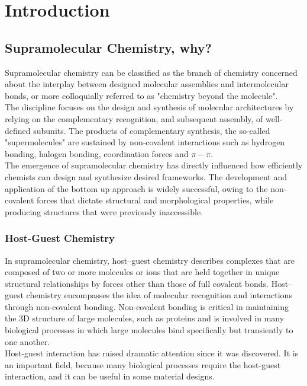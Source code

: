 \documentclass[../Master.tex]{subfiles}
\begin{document}
\chapter{Introduction}
\section{Supramolecular Chemistry, why?}\label{sec:supramolecular-chemistry}
Supramolecular chemistry can be classified as the branch of chemistry concerned about the interplay between designed molecular assemblies and intermolecular bonds, or more colloquially referred to as "chemistry beyond the molecule". \\
The discipline focuses on the design and synthesis of molecular architectures by relying on the complementary recognition, and subsequent assembly, of well-defined subunits. The products of complementary synthesis, the so-called "supermolecules" are sustained by non-covalent interactions such as hydrogen bonding, halogen bonding, coordination forces and \(\pi-\pi\). \\
The emergence of supramolecular chemistry has directly influenced how efficiently chemists can design and synthesize desired frameworks. The development and application of the bottom up approach is widely successful, owing to the non-covalent forces that dictate structural and morphological properties, while producing structures that were previously inaccessible.

\subsection{Host-Guest Chemistry}\label{subsec:host-guest-chemistry}

In supramolecular chemistry, host–guest chemistry describes complexes that are composed of two or more molecules or ions that are held together in unique structural relationships by forces other than those of full covalent bonds. Host–guest chemistry encompasses the idea of molecular recognition and interactions through non-covalent bonding. Non-covalent bonding is critical in maintaining the 3D structure of large molecules, such as proteins and is involved in many biological processes in which large molecules bind specifically but transiently to one another.\\
Host-guest interaction has raised dramatic attention since it was discovered. It is an important field, because many biological processes require the host-guest interaction, and it can be useful in some material designs.
\end{document}

